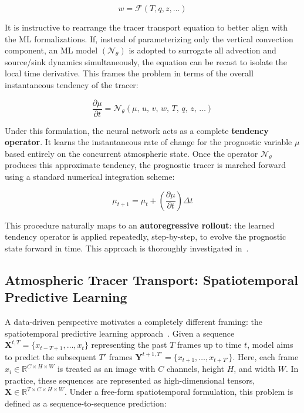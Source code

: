 \documentclass[11pt]{article}
\begin{document}
        \begin{equation}
        w = \mathcal{F}(T, q, z, \dots)
        \end{equation}


        It is instructive to rearrange the tracer transport equation to better align with the ML formalizations. If, instead of parameterizing only the vertical convection component, an ML model $(\mathcal{N}_{\theta})$ is adopted to surrogate all advection and source/sink dynamics simultaneously, the equation can be recast to isolate the local time derivative. This frames the problem in terms of the overall instantaneous tendency of the tracer:

        \begin{equation}
        \frac{\partial \mu}{\partial t} = \mathcal{N}_{\theta}(\mu,\, u,\, v,\, w,\, T,\, q,\, z,\, \dots)
        \end{equation}

        \noindent
        Under this formulation, the neural network acts as a complete \textbf{tendency operator}. It learns the instantaneous rate of change for the prognostic variable $\mu$ based entirely on the concurrent atmospheric state. Once the operator $\mathcal{N}_{\theta}$ produces this approximate tendency, the prognostic tracer is marched forward using a standard numerical integration scheme:

        \begin{equation}
        \mu_{t+1} = \mu_t + \left( \frac{\partial \mu}{\partial t} \right) \Delta t
        \end{equation}

        \noindent
        This procedure naturally maps to an \textbf{autoregressive rollout}: the learned tendency operator is applied repeatedly, step-by-step, to evolve the prognostic state forward in time. This approach is thoroughly investigated in~\cite{benson2025atmospheric}.
    
    \subsection{Atmospheric Tracer Transport: Spatiotemporal Predictive Learning}
        A data-driven perspective motivates a completely different framing: the spatiotemporal predictive learning approach~\cite{erfani2026spatiotemporal}. Given a sequence $\mathbf{X}^{t,T} = \{x_{t-T+1}, \dots, x_t\}$ representing the past $T$ frames up to time $t$, model aims to predict the subsequent $T'$ frames $\mathbf{Y}^{t+1,T'} = \{x_{t+1}, \dots, x_{t+T'}\}$. Here, each frame $x_i \in \mathbb{R}^{C \times H \times W}$ is treated as an image with $C$ channels, height $H$, and width $W$. In practice, these sequences are represented as high-dimensional tensors, $\mathbf{X} \in \mathbb{R}^{T \times C \times H \times W}$. Under a free-form spatiotemporal formulation, this problem is defined as a sequence-to-sequence prediction:
\end{document}
